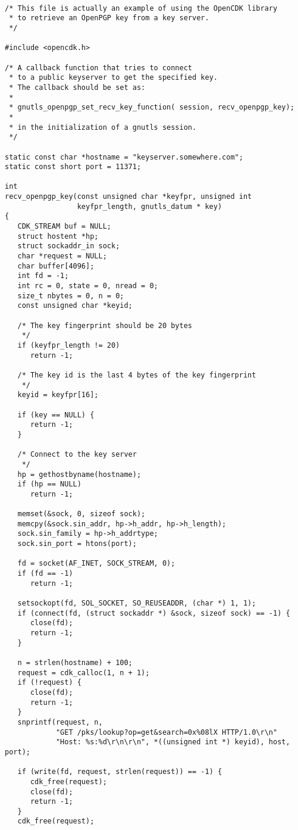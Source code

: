 \begin {verbatim}

/* This file is actually an example of using the OpenCDK library
 * to retrieve an OpenPGP key from a key server.
 */

#include <opencdk.h>

/* A callback function that tries to connect
 * to a public keyserver to get the specified key.
 * The callback should be set as:
 *
 * gnutls_openpgp_set_recv_key_function( session, recv_openpgp_key);
 *
 * in the initialization of a gnutls session.
 */

static const char *hostname = "keyserver.somewhere.com";
static const short port = 11371;

int
recv_openpgp_key(const unsigned char *keyfpr, unsigned int
                 keyfpr_length, gnutls_datum * key)
{
   CDK_STREAM buf = NULL;
   struct hostent *hp;
   struct sockaddr_in sock;
   char *request = NULL;
   char buffer[4096];
   int fd = -1;
   int rc = 0, state = 0, nread = 0;
   size_t nbytes = 0, n = 0;
   const unsigned char *keyid;

   /* The key fingerprint should be 20 bytes
    */
   if (keyfpr_length != 20)
      return -1;

   /* The key id is the last 4 bytes of the key fingerprint
    */
   keyid = keyfpr[16];

   if (key == NULL) {
      return -1;
   }

   /* Connect to the key server 
    */
   hp = gethostbyname(hostname);
   if (hp == NULL)
      return -1;

   memset(&sock, 0, sizeof sock);
   memcpy(&sock.sin_addr, hp->h_addr, hp->h_length);
   sock.sin_family = hp->h_addrtype;
   sock.sin_port = htons(port);

   fd = socket(AF_INET, SOCK_STREAM, 0);
   if (fd == -1)
      return -1;

   setsockopt(fd, SOL_SOCKET, SO_REUSEADDR, (char *) 1, 1);
   if (connect(fd, (struct sockaddr *) &sock, sizeof sock) == -1) {
      close(fd);
      return -1;
   }

   n = strlen(hostname) + 100;
   request = cdk_calloc(1, n + 1);
   if (!request) {
      close(fd);
      return -1;
   }
   snprintf(request, n,
            "GET /pks/lookup?op=get&search=0x%
            "Host: %

   if (write(fd, request, strlen(request)) == -1) {
      cdk_free(request);
      close(fd);
      return -1;
   }
   cdk_free(request);


\end{verbatim}
